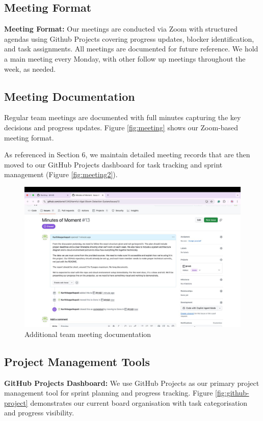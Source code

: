 \documentclass[12pt]{article}
\begin{document}
\subsection{Meeting Format}

\textbf{Meeting Format:}
Our meetings are conducted via Zoom with structured agendas using Github Projects covering progress updates, blocker identification, and task assignments. All meetings are documented for future reference. We hold a main meeting every Monday, with other follow up meetings throughout the week, as needed.

\subsection{Meeting Documentation}
Regular team meetings are documented with full minutes capturing the key decisions and progress updates. Figure \ref{fig:meeting} shows our Zoom-based meeting format.

As referenced in Section 6, we maintain detailed meeting records that are then moved to our GitHub Projects dashboard for task tracking and sprint management (Figure \ref{fig:meeting2}).

\begin{figure}[H]
\centering
\includegraphics[width=0.8\linewidth]{Meetings3.jpeg}
\captionsetup{width=.8\linewidth} 
\caption[Additional Team Meeting]{Additional team meeting documentation}
\label{fig:meeting3}
\end{figure}

\subsection{Project Management Tools}
\textbf{GitHub Projects Dashboard:}
We use GitHub Projects as our primary project management tool for sprint planning and progress tracking. Figure \ref{fig:github-project} demonstrates our current board organisation with task categorisation and progress visibility.
\end{document}
